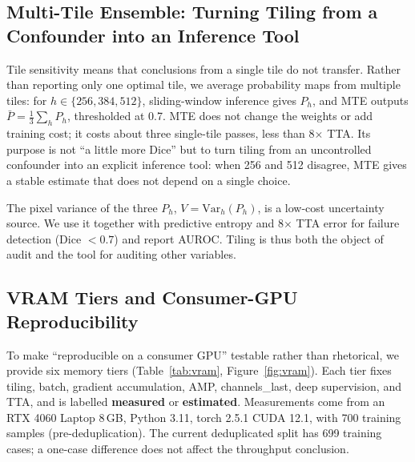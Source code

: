 \subsection{Multi-Tile Ensemble: Turning Tiling from a Confounder into an Inference Tool}\label{sec:mte-system}

Tile sensitivity means that conclusions from a single tile do not transfer. Rather than reporting only one optimal tile, we average probability maps from multiple tiles: for $h\in\{256,384,512\}$, sliding-window inference gives $P_h$, and MTE outputs $\bar P=\frac{1}{3}\sum_h P_h$, thresholded at 0.7. MTE does not change the weights or add training cost; it costs about three single-tile passes, less than 8$\times$ TTA. Its purpose is not ``a little more Dice'' but to turn tiling from an uncontrolled confounder into an explicit inference tool: when 256 and 512 disagree, MTE gives a stable estimate that does not depend on a single choice.

The pixel variance of the three $P_h$, $V=\mathrm{Var}_h(P_h)$, is a low-cost uncertainty source. We use it together with predictive entropy and 8$\times$ TTA error for failure detection (Dice $<0.7$) and report AUROC. Tiling is thus both the object of audit and the tool for auditing other variables.

\subsection{VRAM Tiers and Consumer-GPU Reproducibility}\label{sec:vram}

To make ``reproducible on a consumer GPU'' testable rather than rhetorical, we provide six memory tiers (Table~\ref{tab:vram}, Figure~\ref{fig:vram}). Each tier fixes tiling, batch, gradient accumulation, AMP, channels\_last, deep supervision, and TTA, and is labelled \textbf{measured} or \textbf{estimated}. Measurements come from an RTX 4060 Laptop 8\,GB, Python 3.11, torch 2.5.1 CUDA 12.1, with 700 training samples (pre-deduplication). The current deduplicated split has 699 training cases; a one-case difference does not affect the throughput conclusion.

